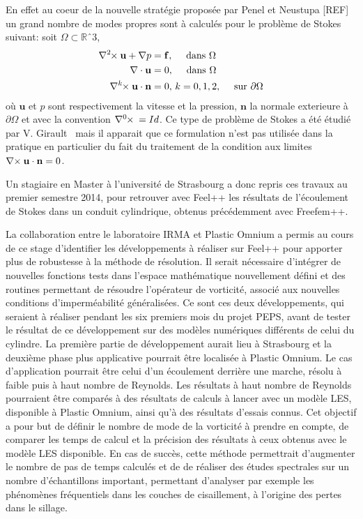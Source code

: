 \documentclass{article}
\newcommand{\curlk}[1][k]{\ensuremath{\nabla^{#1}\hspace{-.3em}\times}\xspace}
\begin{document}
En effet au coeur de la nouvelle stratégie proposée par Penel et Neustupa [REF]
un grand nombre de modes propres sont à calculés pour le problème de Stokes
suivant: soit $\Omega \subset \mathbb{R}ˆ3$,
\begin{align}
  \label{eq:1}
  \curlk[2]{} \mathbf{u} + \nabla p &= \mathbf{f},\quad \mbox{ dans } \Omega\\
  \nabla \cdot \mathbf{u} &= 0,\quad \mbox{ dans } \Omega\\
  \curlk{} \mathbf{u} \cdot \mathbf{n} &= 0,\, k=0,1,2,\quad \mbox{ sur
  } \partial \Omega
\end{align}
où $\mathbf{u}$ et $p$ sont respectivement la vitesse et la pression,
$\mathbf{n}$ la normale exterieure à $\partial \Omega$ et avec la convention
$\curlk[0]{} = Id$. Ce type de problème de Stokes a été étudié par
V. Girault~\cite{girault90-1} mais il apparait que ce formulation n'est pas
utilisée dans la pratique en particulier du fait du traitement de la condition
aux limites $\curlk[]{} \mathbf{u}\cdot \mathbf{n} = 0$.

Un stagiaire en Master à l’université de Strasbourg a donc repris ces travaux au
premier semestre 2014, pour retrouver avec Feel++ les résultats de l’écoulement
de Stokes dans un conduit cylindrique, obtenus précédemment avec Freefem++.

La collaboration entre le laboratoire IRMA et Plastic Omnium a permis au cours
de ce stage d’identifier les développements à réaliser sur Feel++ pour apporter
plus de robustesse à la méthode de résolution. Il serait nécessaire d’intégrer
de nouvelles fonctions tests dans l’espace mathématique nouvellement défini et
des routines permettant de résoudre l’opérateur de vorticité, associé aux
nouvelles conditions d’imperméabilité généralisées. Ce sont ces deux
développements, qui seraient à réaliser pendant les six premiers mois du projet
PEPS, avant de tester le résultat de ce développement sur des modèles numériques
différents de celui du cylindre. La première partie de développement aurait lieu
à Strasbourg et la deuxième phase plus applicative pourrait être localisée à
Plastic Omnium. Le cas d’application pourrait être celui d’un écoulement
derrière une marche, résolu à faible puis à haut nombre de Reynolds. Les
résultats à haut nombre de Reynolds pourraient être comparés à des résultats de
calculs à lancer avec un modèle LES, disponible à Plastic Omnium, ainsi qu’à des
résultats d’essais connus. Cet objectif a pour but de définir le nombre de mode
de la vorticité à prendre en compte, de comparer les temps de calcul et la
précision des résultats à ceux obtenus avec le modèle LES disponible. En cas de
succès, cette méthode permettrait d’augmenter le nombre de pas de temps calculés
et de de réaliser des études spectrales sur un nombre d’échantillons important,
permettant d’analyser par exemple les phénomènes fréquentiels dans les couches
de cisaillement, à l’origine des pertes dans le sillage.
\end{document}
